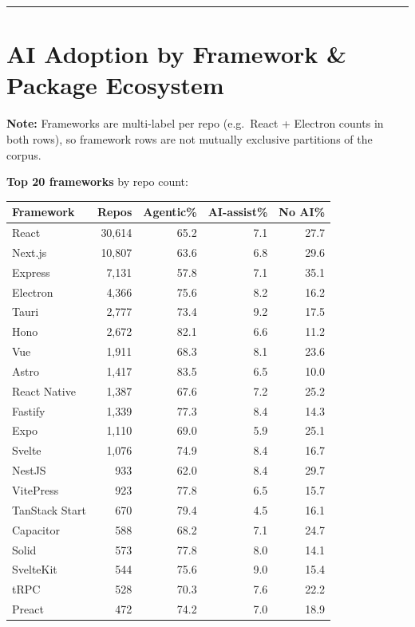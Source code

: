 \documentclass[10pt,a4paper]{article}
\begin{document}
\vspace{6pt}
\hrule
\vspace{6pt}

\newpage
\section*{AI Adoption by Framework \& Package Ecosystem}

\textbf{Note:} Frameworks are multi-label per repo (e.g.\ React + Electron counts in both rows),
so framework rows are not mutually exclusive partitions of the corpus.

\vspace{4pt}
\textbf{Top 20 frameworks} by repo count:

\vspace{3pt}
\begin{tabular}{@{}lrrrr@{}}
\toprule
Framework & Repos & Agentic\% & AI-assist\% & No AI\% \\
\midrule
React          & 30,614 & 65.2 & 7.1 & 27.7 \\
Next.js        & 10,807 & 63.6 & 6.8 & 29.6 \\
Express        &  7,131 & 57.8 & 7.1 & 35.1 \\
Electron       &  4,366 & 75.6 & 8.2 & 16.2 \\
Tauri          &  2,777 & 73.4 & 9.2 & 17.5 \\
Hono           &  2,672 & 82.1 & 6.6 & 11.2 \\
Vue            &  1,911 & 68.3 & 8.1 & 23.6 \\
Astro          &  1,417 & 83.5 & 6.5 & 10.0 \\
React Native   &  1,387 & 67.6 & 7.2 & 25.2 \\
Fastify        &  1,339 & 77.3 & 8.4 & 14.3 \\
Expo           &  1,110 & 69.0 & 5.9 & 25.1 \\
Svelte         &  1,076 & 74.9 & 8.4 & 16.7 \\
NestJS         &    933 & 62.0 & 8.4 & 29.7 \\
VitePress      &    923 & 77.8 & 6.5 & 15.7 \\
TanStack Start &    670 & 79.4 & 4.5 & 16.1 \\
Capacitor      &    588 & 68.2 & 7.1 & 24.7 \\
Solid          &    573 & 77.8 & 8.0 & 14.1 \\
SvelteKit      &    544 & 75.6 & 9.0 & 15.4 \\
tRPC           &    528 & 70.3 & 7.6 & 22.2 \\
Preact         &    472 & 74.2 & 7.0 & 18.9 \\
\bottomrule
\end{tabular}
\end{document}

